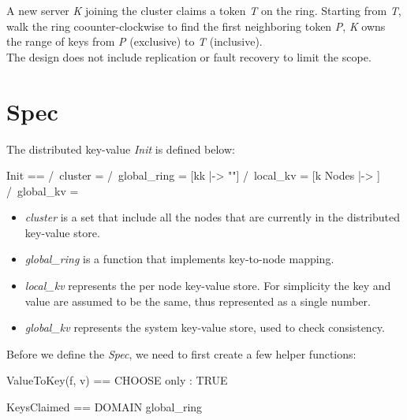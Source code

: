 A new server \textit{K} joining the cluster claims a token \textit{T} on the
ring. Starting from \textit{T}, walk the ring coounter-clockwise to find the
first neighboring token \textit{P}, \textit{K} owns the range of keys from
\textit{P} (exclusive) to \textit{T} (inclusive).\\

The design does not include replication or fault recovery to limit the scope.

\section{Spec}

The distributed key-value \textit{Init} is defined below:\\

\begin{tla}
Init ==
    /\ cluster = {}
    /\ global_ring = [kk \in {} |-> ""]
    /\ local_kv = [k \in Nodes |-> {}]
    /\ global_kv = {}
\end{tla}
\begin{tlatex}
%
%
%
\end{tlatex}

\begin{itemize}
    \item \textit{cluster} is a set that include all the nodes that are currently in the distributed key-value store.
    \item \textit{global\_ring} is a function that implements key-to-node mapping.
    \item \textit{local\_kv} represents the per node key-value store. For
    simplicity the key and value are assumed to be the same, thus represented
    as a single number.
    \item \textit{global\_kv} represents the system key-value store, used to check consistency.
\end{itemize}

Before we define the \textit{Spec}, we need to first create a few helper functions:\\
\begin{tla}
ValueToKey(f, v) == 
    CHOOSE only : TRUE

KeysClaimed == 
    DOMAIN global_ring
\end{tla}
\begin{tlatex}
%
\@pvspace{8.0pt}%
%
%
\end{tlatex}
\\

